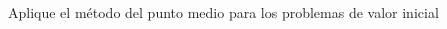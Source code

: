 \begin{questions}
    \question

    Aplique el método del punto medio para los problemas de valor inicial

    \begin{multicols}{3}
\end{multicols}
\end{questions}
